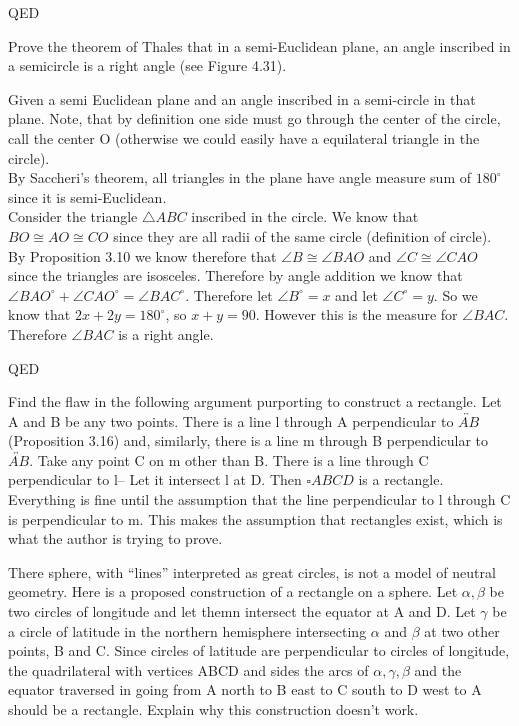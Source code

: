 \documentclass[12pt,letterpaper]{article}
\newcommand{\Proof}{\noindent {\bf Proof: }}
\newcommand{\QED}{\begin{flushright}QED\end{flushright}}
\newcommand{\prob}[1]{\newpage\noindent {\bf #1}}
\begin{document}
\QED



\prob{19} Prove the theorem of Thales that in a semi-Euclidean plane, an angle inscribed in a semicircle is a right angle (see Figure 4.31).\\

\Proof

Given a semi Euclidean plane and an angle inscribed in a semi-circle in that plane.  Note, that by definition one side must go through the center of the circle, call the center O (otherwise we could easily have a equilateral triangle in the circle).  \\

By Saccheri's theorem, all triangles in the plane have angle measure sum of $180^\circ$ since it is semi-Euclidean.\\

Consider the triangle $\triangle ABC$ inscribed in the circle.  We know that $BO \cong AO \cong CO$ since they are all radii of the same circle (definition of circle).  By Proposition 3.10 we know therefore that $\angle B \cong \angle BAO$ and $\angle C \cong \angle CAO$ since the triangles are isosceles. Therefore by angle addition we know that $\angle BAO^\circ+ \angle CAO^\circ = \angle BAC^\circ$. Therefore let $\angle B^\circ = x$ and let $\angle C^\circ = y$. So we know that $2x + 2y = 180^\circ$, so $x+y = 90$.  However this is the measure for $\angle BAC$.  Therefore $\angle BAC$ is a right angle. 

\QED





\prob{20a} Find the flaw in the following argument purporting to construct a rectangle.  Let A and B be any two points.  There is a line l through A perpendicular to $\overleftrightarrow{AB}$ (Proposition 3.16)  and, similarly, there is a line m through B perpendicular to $\overleftrightarrow{AB}$. Take any point C on m other than B.  There is a line through C perpendicular to l-- Let it intersect l at D.  Then $\square ABCD$ is a rectangle.\\

Everything is fine until the assumption that the line perpendicular to l through C is perpendicular to m.  This makes the assumption that rectangles exist, which is what the author is trying to prove.


\prob{21} There sphere, with ``lines'' interpreted as great circles, is not a model of neutral geometry.  Here is a proposed construction of a rectangle on a sphere.  Let $\alpha, \beta$ be two circles of longitude and let themn intersect the equator at A and D.  Let $\gamma$ be a circle of latitude in the northern hemisphere intersecting $\alpha$ and $\beta$ at two other points, B and C.  Since circles of latitude are perpendicular to circles of longitude, the quadrilateral with vertices ABCD and sides the arcs of $\alpha, \gamma, \beta$ and the equator traversed in going from A north to B east to C south to D west to A should be a rectangle.  Explain why this construction doesn't work.\\
\end{document}

